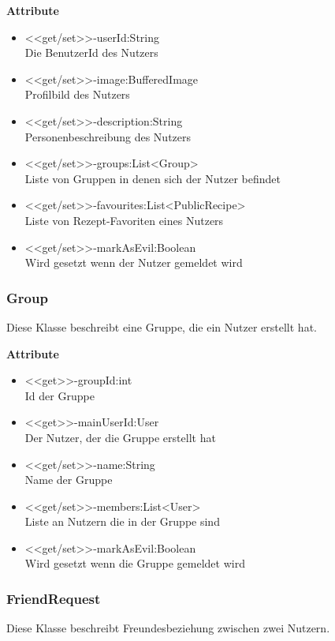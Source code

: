 \textbf{Attribute}
\begin{itemize}
	\item <<get/set>>-userId:String \\Die BenutzerId des Nutzers
	\item <<get/set>>-image:BufferedImage \\Profilbild des Nutzers
	\item <<get/set>>-description:String \\Personenbeschreibung des Nutzers
	\item <<get/set>>-groups:List<Group> \\Liste von Gruppen in denen sich der Nutzer befindet
	\item <<get/set>>-favourites:List<PublicRecipe> \\Liste von Rezept-Favoriten eines Nutzers
 	\item <<get/set>>-markAsEvil:Boolean \\Wird gesetzt wenn der Nutzer gemeldet wird
\end{itemize}

\subsubsection{Group}
Diese Klasse beschreibt eine Gruppe, die ein Nutzer erstellt hat.

\textbf{Attribute}
\begin{itemize}
	\item <<get>>-groupId:int \\Id der Gruppe
	\item <<get>>-mainUserId:User \\Der Nutzer, der die Gruppe erstellt hat
	\item <<get/set>>-name:String \\Name der Gruppe
	\item <<get/set>>-members:List<User> \\Liste an Nutzern die in der Gruppe sind
	\item <<get/set>>-markAsEvil:Boolean \\Wird gesetzt wenn die Gruppe gemeldet wird
\end{itemize}

\subsubsection{FriendRequest}
Diese Klasse beschreibt Freundesbeziehung zwischen zwei Nutzern.

